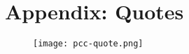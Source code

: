 \section{Appendix: Quotes}
\label{appendix:quotes}


\begin{figure}[H]
	\centering
	\texttt{[image: pcc-quote.png]}
\end{figure}


	
